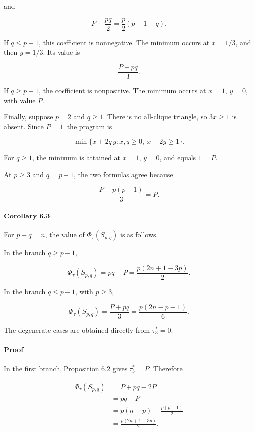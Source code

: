 \documentclass[english,11pt,a4paper]{article}
\begin{document}
and

\[
P-\frac{pq}{2}
=
\frac p2(p-1-q).
\]

If \(q\le p-1\), this coefficient is nonnegative. The minimum occurs at
\(x=1/3\), and then \(y=1/3\). Its value is

\[
\frac{P+pq}{3}.
\]

If \(q\ge p-1\), the coefficient is nonpositive. The minimum occurs at
\(x=1\), \(y=0\), with value \(P\).

Finally, suppose \(p=2\) and \(q\ge1\). There is no all-clique triangle,
so \(3x\ge1\) is absent. Since \(P=1\), the program is

\[
\min\{x+2q\,y:x,y\ge0,\ x+2y\ge1\}.
\]

For \(q\ge1\), the minimum is attained at \(x=1\), \(y=0\), and equals
\(1=P\).

At \(p\ge3\) and \(q=p-1\), the two formulas agree because

\[
\frac{P+p(p-1)}{3}=P.
\]

\paragraph{Corollary 6.3}\label{corollary-6.3}

For \(p+q=n\), the value of \(\Phi_\tau(S_{p,q})\) is as follows.

In the branch \(q\ge p-1\),

\[
\Phi_\tau(S_{p,q})
=
pq-P
=
\frac{p(2n+1-3p)}2.
\tag{6.1}
\]

In the branch \(q\le p-1\), with \(p\ge3\),

\[
\Phi_\tau(S_{p,q})
=
\frac{P+pq}{3}
=
\frac{p(2n-p-1)}6.
\tag{6.2}
\]

The degenerate cases are obtained directly from \(\tau_3^*=0\).

\paragraph{Proof}\label{proof-10}

In the first branch, Proposition 6.2 gives \(\tau_3^*=P\). Therefore

\[
\begin{aligned}
\Phi_\tau(S_{p,q})
&=
P+pq-2P\\
&=
pq-P\\
&=
p(n-p)-\frac{p(p-1)}2\\
&=
\frac{p(2n+1-3p)}2.
\end{aligned}
\]
\end{document}
